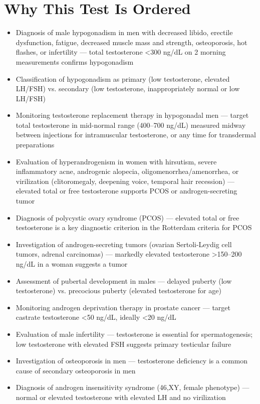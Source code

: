 \section*{Why This Test Is Ordered}
\begin{itemize}
  \item Diagnosis of male hypogonadism in men with decreased libido, erectile dysfunction, fatigue, decreased muscle mass and strength, osteoporosis, hot flashes, or infertility --- total testosterone <300 ng/dL on 2 morning measurements confirms hypogonadism
  \item Classification of hypogonadism as primary (low testosterone, elevated LH/FSH) vs. secondary (low testosterone, inappropriately normal or low LH/FSH)
  \item Monitoring testosterone replacement therapy in hypogonadal men --- target total testosterone in mid-normal range (400--700 ng/dL) measured midway between injections for intramuscular testosterone, or any time for transdermal preparations
  \item Evaluation of hyperandrogenism in women with hirsutism, severe inflammatory acne, androgenic alopecia, oligomenorrhea/amenorrhea, or virilization (clitoromegaly, deepening voice, temporal hair recession) --- elevated total or free testosterone supports PCOS or androgen-secreting tumor
  \item Diagnosis of polycystic ovary syndrome (PCOS) --- elevated total or free testosterone is a key diagnostic criterion in the Rotterdam criteria for PCOS
  \item Investigation of androgen-secreting tumors (ovarian Sertoli-Leydig cell tumors, adrenal carcinomas) --- markedly elevated testosterone >150--200 ng/dL in a woman suggests a tumor
  \item Assessment of pubertal development in males --- delayed puberty (low testosterone) vs. precocious puberty (elevated testosterone for age)
  \item Monitoring androgen deprivation therapy in prostate cancer --- target castrate testosterone <50 ng/dL, ideally <20 ng/dL
  \item Evaluation of male infertility --- testosterone is essential for spermatogenesis; low testosterone with elevated FSH suggests primary testicular failure
  \item Investigation of osteoporosis in men --- testosterone deficiency is a common cause of secondary osteoporosis in men
  \item Diagnosis of androgen insensitivity syndrome (46,XY, female phenotype) --- normal or elevated testosterone with elevated LH and no virilization
\end{itemize}


